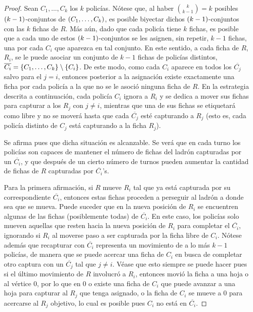 \begin{proof}
    Sean $C_1,\dots, C_k$ los $k$ polic\'ias. N\'otese que, al haber
    $\binom{k}{k-1}=k$ posibles $\left( k-1\right)$-conjuntos de $\left( C_1,\dots, C_k\right)$, es
    posible biyectar dichos $\left( k-1\right)$-conjuntos con las $k$ fichas de $R$. M\'as
    a\'un, dado que cada polic\'ia tiene $k$ fichas, es posible que a cada uno de
    estos $\left( k-1\right)$-conjuntos se les asignen, sin repetir, $k-1$ fichas, una por
    cada $C_i$ que aparezca en tal conjunto. En este sentido, a cada ficha de
    $R$, $R_i$, se le puede asociar un conjunto de $k-1$ fichas de polic\'ias
    distintos, $\overline{C_i}=\left\{ C_1,\dots,C_k\right\}\setminus\left\{ C_i\right\}$. De este modo,
    como cada $C_i$ aparece en todos los $\overline{C_j}$ salvo para el $j=i$,
    entonces posterior a la asignaci\'on existe exactamente una ficha por cada
    polic\'ia a la que no se le asoci\'o ninguna ficha de $R$. En la estrategia
    descrita a continuaci\'on, cada polic\'ia $C_i$ ignora a $R_i$ y se dedica a
    mover sus fichas para capturar a los $R_j$ con $j\neq i$, mientras que una
    de sus fichas se etiquetar\'a como libre y no se mover\'a hasta que cada
    $\overline{C_j}$ est\'e capturando a $R_j$ (esto es, cada polic\'ia distinto de
    $C_j$ est\'a capturando a la ficha $R_j$).

    Se afirma pues que dicha situaci\'on es alcanzable. Se ver\'a que en cada turno
    los polic\'ias son capaces de mantener el n\'umero de fichas del ladr\'on
    capturadas por un $\overline{C_i}$, y que despu\'es de un cierto n\'umero de
    turnos pueden aumentar la cantidad de fichas de $R$ capturadas por
    $\overline{C_i}$'s.

    Para la primera afirmaci\'on, si $R$ mueve $R_i$ tal que ya est\'a capturada por
    su correspondiente $\overline{C_i}$, entonces estas fichas proceden a
    perseguir al ladr\'on a donde sea que se mueva. Puede suceder que en la nueva
    posici\'on de $R_i$ se encuentren algunas de las fichas (posiblemente todas)
    de $\overline{C_i}$. En este caso, los polic\'ias solo mueven aquellas que
    resten hacia la nueva posici\'on de $R_i$ para completar el $\overline{C_i}$,
    ignorando si $R_i$ al moverse paso a ser capturada por la ficha libre de
    $C_i$. N\'otese adem\'as que recapturar con $\overline{C_i}$ representa un
    movimiento de a lo m\'as $k-1$ polic\'ias, de manera que se puede acercar una
    ficha de $C_i$ en busca de completar otro captura con un $\overline{C_j}$ tal
    que $j\neq i$. V\'ease que esto siempre se puede hacer pues si el \'ultimo
    movimiento de $R$ involucr\'o a $R_i$, entonces movi\'o la ficha a una hoja o al
    v\'ertice $0$, por lo que en $0$ o existe una ficha de $C_i$ que puede avanzar
    a una hoja para capturar al $R_j$ que tenga asignado, o la ficha de $C_i$ se
    mueve a $0$ para acercarse al $R_j$ objetivo, lo cual es posible pues $C_i$
    no est\'a en $\overline{C_i}$.
    

\end{proof}
